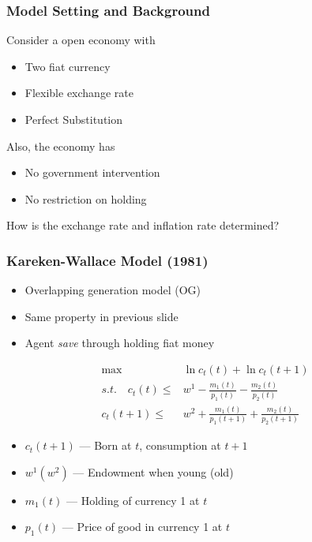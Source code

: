 \begin{frame}
    \frametitle{Model Setting and Background}
    Consider a open economy with 
    \begin{itemize}
        \item Two fiat currency
        \item Flexible exchange rate
        \item Perfect Substitution
    \end{itemize}

    \vfill 

    Also, the economy has 

    \begin{itemize}
        \item No government intervention
        \item No restriction on holding
    \end{itemize}

    \vfill

    How is the exchange rate and inflation rate determined?
    

\end{frame}

\begin{frame}
    \frametitle{Kareken-Wallace Model (1981)}
    \begin{itemize}
        \item Overlapping generation model (OG)
        \item Same property in previous slide
        \item Agent \emph{save} through holding fiat money
    \end{itemize}

    \begin{equation*}
        \begin{aligned}
            \max \quad & \ln c_t(t) + \ln c_t(t+1) \\
            s.t. \quad c_t(t) \le& w^1 - \frac{m_1(t)}{p_1(t)}- \frac{m_2(t)}{p_2(t)} \\ 
            c_t(t+1) \le& w^2 + \frac{m_1(t)}{p_1(t+1)}+ \frac{m_2(t)}{p_2(t+1)}
        \end{aligned}
    \end{equation*}

    \begin{itemize}
        \item $c_t(t+1)$ --- Born at $t$, consumption at $t+1$
        \item $w^1(w^2)$ --- Endowment when young (old)
        \item $m_1(t)$ --- Holding of currency 1 at $t$
        \item $p_1(t)$ --- Price of good in currency 1 at $t$
    \end{itemize}

\end{frame}

